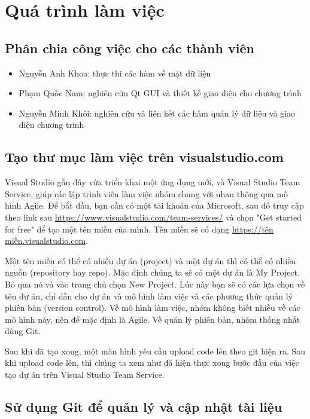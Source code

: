 \documentclass[12pt,a4paper]{report}
\begin{document}
    \section{Quá trình làm việc}
        \subsection{Phân chia công việc cho các thành viên}
        \begin{itemize}
            \item Nguyễn Anh Khoa: thực thi các hàm về mặt dữ liệu
            \item Phạm Quốc Nam: nghiên cứu Qt GUI và thiết kế giao diện cho chương trình
            \item Nguyễn Minh Khôi: nghiên cứu và liên kết các hàm quản lý dữ liệu và giao diện chương trinh
        \end{itemize}
        \subsection{Tạo thư mục làm việc trên visualstudio.com}

        Visual Studio gần đây vừa triển khai một ứng dụng mới, và Visual Studio Team Service, giúp các lập trình viên làm việc nhóm chung với nhau thông qua mô hình Agile. Để bắt đầu, bạn cần có một tài khoản của Microsoft, sau đó truy cập theo link sau \url{https://www.visualstudio.com/team-services/} và chọn "Get started for free" để tạo một tên miền của mình. Tên miền sẽ có dạng \url{https://tên miền.visualstudio.com}.\par
        Một tên miền có thể có nhiều dự án (project) và một dự án thì có thể có nhiều nguồn (repository hay repo). Mặc định chúng ta sẽ có một dự án là My Project. Bỏ qua nó và vào trang chủ chọn New Project. Lúc này bạn sẽ có các lựa chọn về tên đự án, chỉ dẫn cho dự án và mô hình làm việc và các phương thức quản lý phiên bản (version control). Về mô hình làm việc, nhóm không biết nhiều về các mô hình này, nên để mặc định là Agile. Về quản lý phiên bản, nhóm thống nhất dùng Git.\par
        Sau khi đã tạo xong, một màn hình yêu cầu upload code lên theo git hiện ra. Sau khi upload code lên, thì chúng ta xem như đã hiện thực xong bước đầu của việc tạo dự án trên Visual Studio Team Service.

        \subsection{Sử dụng Git để quản lý và cập nhật tài liệu}
\end{document}
